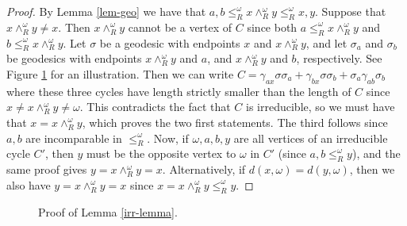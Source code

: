 \documentclass[A4paper, oneside]{amsart}
\theoremstyle{definition}
\begin{document}
\begin{proof}
    By Lemma \ref{lem-geo} we have that $a,b \leq_R^{\omega} x \wedge_R^{\omega} y \leq_R^{\omega} x,y$. Suppose that $x \wedge_R^{\omega} y \neq x$. Then $x \wedge_R^{\omega} y$ cannot be a vertex of $C$ since both $a \leq_R^{\omega} x \wedge_R^{\omega} y$ and $b \leq_R^{\omega} x \wedge_R^{\omega} y$. Let $\sigma$ be a geodesic with endpoints $x$ and $x \wedge_R^{\omega} y$, and let $\sigma_a$ and $\sigma_b$ be geodesics with endpoints $x \wedge_R^{\omega} y$ and $a$, and $x \wedge_R^{\omega} y$ and $b$, respectively. See Figure \ref{fig:irr-lemma} for an illustration. Then we can write $C = \gamma_{ax}\sigma\sigma_a + \gamma_{bx}\sigma\sigma_b + \sigma_a\gamma_{ab}\sigma_b$ where these three cycles have length strictly smaller than the length of $C$ since $x\neq x \wedge_R^{\omega} y \neq \omega$. This contradicts the fact that $C$ is irreducible, so we must have that $x = x \wedge_R^{\omega} y$, which proves  the two first statements. The third follows since $a,b$ are incomparable in $ \leq_R^{\omega} $. Now, if $\omega,a,b,y$ are all vertices of an irreducible cycle $C'$, then $y$ must be the opposite vertex to $\omega$ in $C'$ (since $a,b \leq_R^{\omega} y$), and the same proof gives $y = x \wedge_R^{\omega} y = x$. Alternatively, if $d(x,\omega) = d(y,\omega)$, then we also have $y= x \wedge_R^{\omega} y = x$ since $x =  x \wedge_R^{\omega} y \leq_R^{\omega} y$.
\end{proof}

\begin{figure}[h!]
	\centering
	\caption{Proof of Lemma \ref{irr-lemma}.}
	\label{fig:irr-lemma}
\end{figure}
\end{document}
